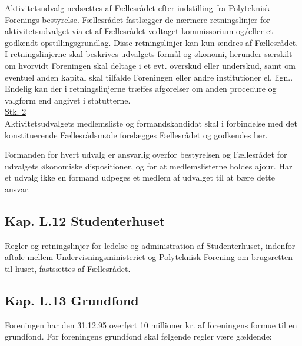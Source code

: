 \item \label{L:Aktivitet:nedsaettelse} Aktivitetsudvalg nedsættes af Fællesrådet efter indstilling fra Polyteknisk Forenings bestyrelse. Fællesrådet fastlægger de nærmere retningslinjer for aktivitetsudvalget via et af Fællesrådet vedtaget kommissorium og/eller et godkendt opstillingsgrundlag. Disse retningslinjer kan kun ændres af Fællesrådet. I retningslinjerne skal beskrives udvalgets formål og økonomi, herunder særskilt om hvorvidt Foreningen skal deltage i et evt. overskud eller underskud, samt om eventuel anden kapital skal tilfalde Foreningen eller andre institutioner el. lign.. Endelig kan der i retningslinjerne træffes afgørelser om anden procedure og valgform end angivet i statutterne.\\

\underline{Stk. 2}\\
Aktivitetsudvalgets medlemsliste og formandskandidat skal i forbindelse med det konstituerende Fællesrådsmøde forelægges Fællesrådet og godkendes her.\\

\item Formanden for hvert udvalg er ansvarlig overfor bestyrelsen og Fællesrådet for udvalgets økonomiske dispositioner, og for at medlemslisterne holdes ajour. Har et udvalg ikke en formand udpeges et medlem af udvalget til at bære dette ansvar.
\subsection*{Kap. L.12 Studenterhuset}
\item Regler og retningslinjer for ledelse og administration af Studenterhuset, indenfor aftale mellem Undervisningsministeriet og Polyteknisk Forening om brugsretten til huset, fastsættes af Fællesrådet.
\subsection*{Kap. L.13 Grundfond}
\item \label{L:Grundfond:10mio} Foreningen har den 31.12.95 overført 10 millioner kr. af foreningens formue til en grundfond. For foreningens grundfond skal følgende regler være gældende:

